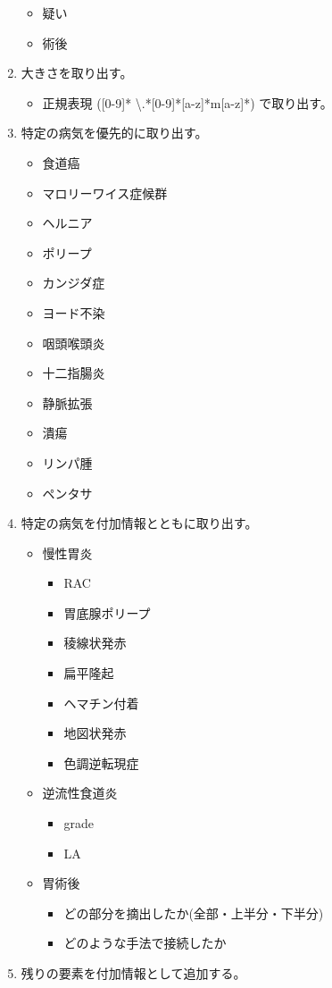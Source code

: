 \begin{enumerate}
\begin{itemize}
        \item 疑い
        \item 術後
    \end{itemize}
    \item 大きさを取り出す。
    \begin{itemize}
        \item 正規表現 ([0-9]* \textbackslash .*[0-9]*[a-z]*m[a-z]*) で取り出す。
    \end{itemize}
    \item 特定の病気を優先的に取り出す。
    \begin{itemize}
        \item 食道癌
        \item マロリーワイス症候群
        \item ヘルニア
        \item ポリープ
        \item カンジダ症
        \item ヨード不染
        \item 咽頭喉頭炎
        \item 十二指腸炎
        \item 静脈拡張
        \item 潰瘍
        \item リンパ腫
        \item ペンタサ
    \end{itemize}
    \item 特定の病気を付加情報とともに取り出す。
    \begin{itemize}
        \item 慢性胃炎
        \begin{itemize}
            \item RAC
            \item 胃底腺ポリープ
            \item 稜線状発赤
            \item 扁平隆起
            \item ヘマチン付着
            \item 地図状発赤
            \item 色調逆転現症
        \end{itemize}
        \item 逆流性食道炎
        \begin{itemize}
            \item grade
            \item LA
        \end{itemize}
        \item 胃術後
        \begin{itemize}
            \item どの部分を摘出したか(全部・上半分・下半分)
            \item どのような手法で接続したか
        \end{itemize}
    \end{itemize}
    \item 残りの要素を付加情報として追加する。
\end{enumerate}
